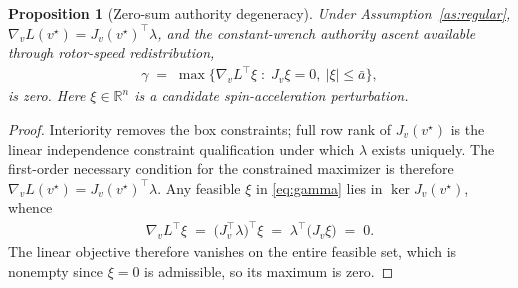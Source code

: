 \documentclass[10pt,a4paper]{amsart}
\newtheorem{proposition}{Proposition}
\begin{document}
\begin{proposition}[Zero-sum authority degeneracy]\label{prop:degeneracy}
Under Assumption~\ref{as:regular}, $\nabla_v L(v^\star)=J_v(v^\star)^{\!\top}\lambda$, and the constant-wrench authority ascent available through rotor-speed redistribution,
\begin{align}
    \gamma \;=\; \max\big\{\nabla_v L^{\!\top}\xi \;:\; J_v\xi = 0,\ |\xi|\le\bar a\big\},
    \label{eq:gamma}
\end{align}
is zero. Here $\xi\in\mathbb{R}^n$ is a candidate spin-acceleration perturbation.
\end{proposition}

\begin{proof}
Interiority removes the box constraints; full row rank of $J_v(v^\star)$ is the linear independence constraint qualification under which $\lambda$ exists uniquely. The first-order necessary condition for the constrained maximizer is therefore $\nabla_v L(v^\star)=J_v(v^\star)^{\!\top}\lambda$. Any feasible $\xi$ in \eqref{eq:gamma} lies in $\ker J_v(v^\star)$, whence
%
\begin{align}
    \nabla_v L^{\!\top}\xi
    \;=\; \big(J_v^{\!\top}\lambda\big)^{\!\top}\xi
    \;=\; \lambda^{\!\top}\big(J_v\xi\big) \;=\; 0 .
    \label{eq:zerosum}
\end{align}
%
The linear objective therefore vanishes on the entire feasible set, which is nonempty since $\xi=0$ is admissible, so its maximum is zero.
\end{proof}
\end{document}
